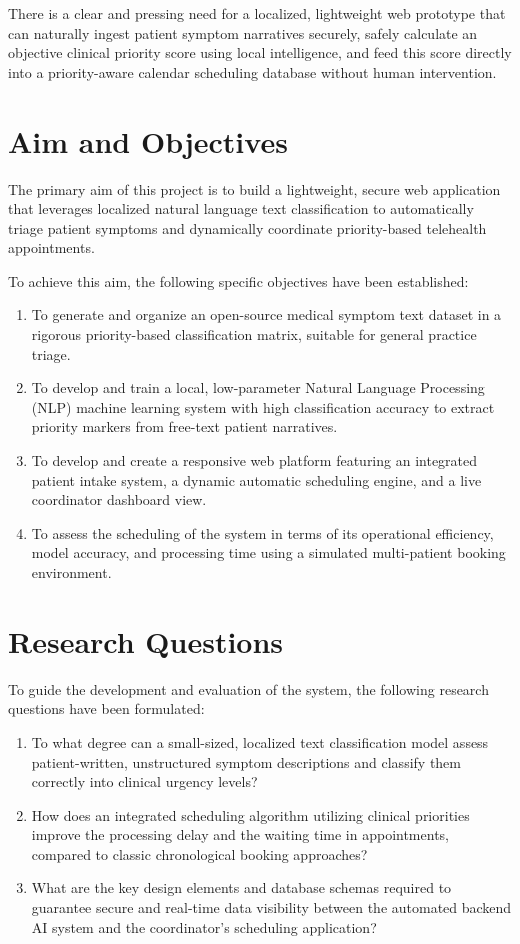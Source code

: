 \documentclass[12pt,a4paper]{report}
\begin{document}
There is a clear and pressing need for a localized, lightweight web prototype that can naturally ingest patient symptom narratives securely, safely calculate an objective clinical priority score using local intelligence, and feed this score directly into a priority-aware calendar scheduling database without human intervention.

\section{Aim and Objectives}
The primary aim of this project is to build a lightweight, secure web application that leverages localized natural language text classification to automatically triage patient symptoms and dynamically coordinate priority-based telehealth appointments. 

To achieve this aim, the following specific objectives have been established:
\begin{enumerate}
    \item To generate and organize an open-source medical symptom text dataset in a rigorous priority-based classification matrix, suitable for general practice triage.
    \item To develop and train a local, low-parameter Natural Language Processing (NLP) machine learning system with high classification accuracy to extract priority markers from free-text patient narratives.
    \item To develop and create a responsive web platform featuring an integrated patient intake system, a dynamic automatic scheduling engine, and a live coordinator dashboard view.
    \item To assess the scheduling of the system in terms of its operational efficiency, model accuracy, and processing time using a simulated multi-patient booking environment.
\end{enumerate}

\section{Research Questions}
To guide the development and evaluation of the system, the following research questions have been formulated:
\begin{enumerate}
    \item To what degree can a small-sized, localized text classification model assess patient-written, unstructured symptom descriptions and classify them correctly into clinical urgency levels?
    \item How does an integrated scheduling algorithm utilizing clinical priorities improve the processing delay and the waiting time in appointments, compared to classic chronological booking approaches?
    \item What are the key design elements and database schemas required to guarantee secure and real-time data visibility between the automated backend AI system and the coordinator's scheduling application?
\end{enumerate}
\end{document}
